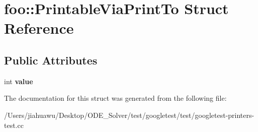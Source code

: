 \hypertarget{structfoo_1_1_printable_via_print_to}{}\section{foo\+:\+:Printable\+Via\+Print\+To Struct Reference}
\label{structfoo_1_1_printable_via_print_to}
\subsection*{Public Attributes}
\begin{DoxyCompactItemize}
\item 
\mbox{\label{structfoo_1_1_printable_via_print_to_a16f8c6420275d86f0d0112ca5a41bca2}} 
int {\bfseries value}
\end{DoxyCompactItemize}


The documentation for this struct was generated from the following file\+:\begin{DoxyCompactItemize}
\item 
/\+Users/jiahuawu/\+Desktop/\+O\+D\+E\+\_\+\+Solver/test/googletest/test/googletest-\/printers-\/test.\+cc\end{DoxyCompactItemize}

